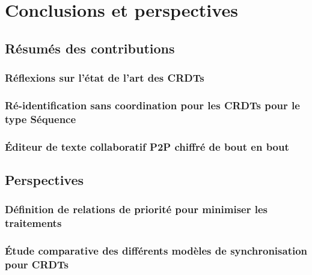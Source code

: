 \NumberThisInToc
\chapter{Conclusions et perspectives}
\minitoc
\label{chap:conclusions-perspectives}



\section{Résumés des contributions}

\subsection{Réflexions sur l'état de l'art des \acp{CRDT}}


\subsection{Ré-identification sans coordination pour les \acp{CRDT} pour le type Séquence}


\subsection{Éditeur de texte collaboratif \ac{P2P} chiffré de bout en bout}


\section{Perspectives}

\subsection{Définition de relations de priorité pour minimiser les traitements}


% 

\subsection{Étude comparative des différents modèles de synchronisation pour \acp{CRDT}}


